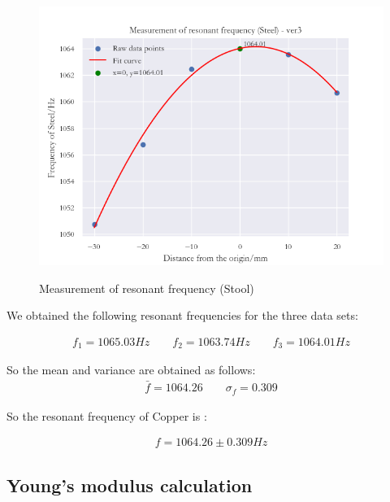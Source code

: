 \documentclass[UTF8]{article}
\begin{document}
\begin{figure}[H]
\begin{minipage}[t]{0.33\linewidth}
         \centering
         \includegraphics[clip,scale=0.35,trim={0 0 0 0}]{fig/fig13.png}
         \label{figure.12}
      \end{minipage} 
     \caption{Measurement of resonant frequency (Stool)}	  
      \end{figure}  
      
       We obtained the following resonant frequencies for the three data sets:
         	 
         	 \begin{eqnarray}
         	 f_1 = 1065.03 Hz \qquad f_2 = 1063.74 Hz \qquad f_3 = 1064.01 Hz
         	 \end{eqnarray}
         	 
         	 So the mean and variance are obtained as follows:
         	 \begin{eqnarray}
         	 \bar{f} = 1064.26 \qquad \sigma_f = 0.309
         	 \end{eqnarray}
         	 
         	 So the resonant frequency of Copper is :
         	 
         	 \begin{eqnarray}
         	 f = 1064.26 \pm 0.309 Hz
         	 \end{eqnarray}    	 
   	 
   	 
   	 
   
   \subsection{Young's modulus calculation}
   
\end{document}
